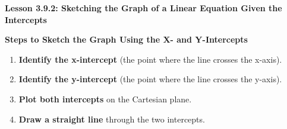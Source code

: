  \begin{center}
\textbf{Lesson 3.9.2: Sketching the Graph of a Linear Equation Given the Intercepts}
\end{center}

\vspace*{1ex}

\noindent\textbf{Steps to Sketch the Graph Using the X- and Y-Intercepts}

\begin{enumerate}
    \item \textbf{Identify the x-intercept} (the point where the line crosses the x-axis).
    \item \textbf{Identify the y-intercept} (the point where the line crosses the y-axis).
    \item \textbf{Plot both intercepts} on the Cartesian plane.
    \item \textbf{Draw a straight line} through the two intercepts.
\end{enumerate}



